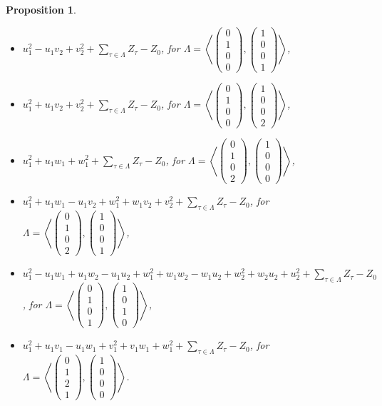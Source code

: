 \documentclass{alggeom}
\newcommand{\vect}[1]{\left( \begin{smallmatrix} #1 \end{smallmatrix} \right)}
\newcommand{\plan}[2]{\left< \vect{ #1 }, \vect{ #2 } \right>}
\theoremstyle{plain}
\newtheorem{prop}[theorem]{Proposition}
\theoremstyle{definition}
\theoremstyle{remark}
\begin{document}
\begin{prop}
\begin{itemize}
$u_1^2+\sum_{\tau\in \Lambda} Z_\tau-Z_0$, for  $\Lambda = \plan{0\\1\\0\\0}{1\\0\\0\\0}$,
\item[(xiv)]
$u_1^2-u_1v_2+v_2^2+ \sum_{\tau\in \Lambda} Z_\tau-Z_0$, for  $\Lambda = \plan{0\\1\\0\\0}{1\\0\\0\\1}$,
\item[(xv)]
$u_1^2+u_1v_2+v_2^2+\sum_{\tau\in \Lambda} Z_\tau-Z_0$, for $\Lambda= \plan{0\\1\\0\\0}{1\\0\\0\\2}$,
\item[(xvi)]
$u_1^2+u_1w_1+w_1^2+\sum_{\tau\in \Lambda} Z_\tau-Z_0$, for $\Lambda = \plan{0\\1\\0\\2}{1\\0\\0\\0}$,
\item[(xvii)]
$u_1^2+u_1w_1-u_1v_2+w_1^2+w_1v_2+v_2^2+\sum_{\tau\in \Lambda} Z_\tau-Z_0$, for $\Lambda = \plan{0\\1\\0\\2}{1\\0\\0\\1}$,
\item[(xviii)]
$u_1^2-u_1w_1+u_1w_2-u_1u_2+w_1^2+w_1w_2-w_1u_2+w_2^2+w_2u_2+u_2^2+\sum_{\tau\in \Lambda} Z_\tau-Z_0$, for  $\Lambda = \plan{0\\1\\0\\1}{1\\0\\1\\0}$,
\item[(xix)]
$u_1^2+u_1v_1-u_1w_1+v_1^2+v_1w_1+w_1^2+\sum_{\tau\in \Lambda} Z_\tau-Z_0$, for $\Lambda = \plan{0\\1\\2\\1}{1\\0\\0\\0}$.
\end{itemize}
\end{prop}
\end{document}
